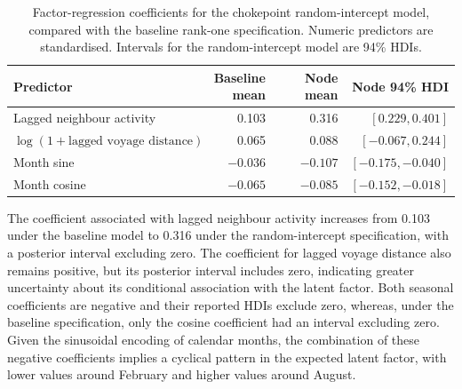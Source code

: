 \documentclass[pdftex,12pt,openright,a4paper,oneside]{book}
\begin{document}
\begin{table}[htbp]
\centering
\caption{Factor-regression coefficients
for the chokepoint random-intercept
model, compared with the baseline
rank-one specification.
Numeric predictors are standardised.
Intervals for the random-intercept
model are 94\% HDIs.}
\label{tab:node_chokepoint_beta}
\small
\begin{tabular}{lrrr}
\hline
Predictor & Baseline mean & Node mean & Node 94\% HDI \\
\hline
Lagged neighbour activity
& 0.103 & 0.316 & $[0.229,0.401]$ \\
$\log(1+\text{lagged voyage distance})$
& 0.065 & 0.088 & $[-0.067,0.244]$ \\
Month sine
& $-0.036$ & $-0.107$ & $[-0.175,-0.040]$ \\
Month cosine
& $-0.065$ & $-0.085$ & $[-0.152,-0.018]$ \\
\hline
\end{tabular}
\end{table}

The coefficient associated with
lagged neighbour activity increases
from 0.103 under the baseline model
to 0.316 under the random-intercept
specification, with a posterior
interval excluding zero.
The coefficient for lagged voyage
distance also remains positive, but
its posterior interval includes zero,
indicating greater uncertainty
about its conditional association
with the latent factor.
Both seasonal coefficients are
negative and their reported HDIs exclude zero, whereas, under the baseline specification, only the
cosine coefficient had an interval excluding zero.
Given the sinusoidal encoding of calendar months, the combination of these negative coefficients implies 
a cyclical pattern in the expected latent factor, with lower values around February and higher values around August.
\end{document}
